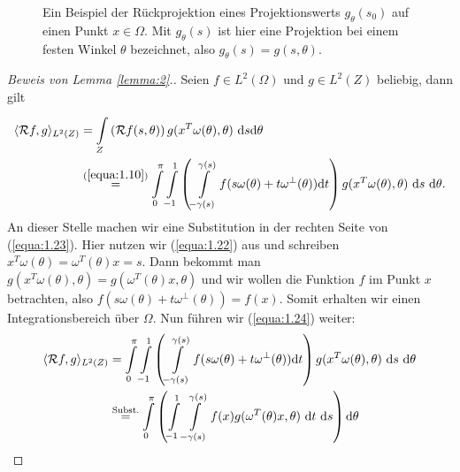 \begin{figure}[!h]
	\caption{Ein Beispiel der Rückprojektion eines Projektionswerts $g_{\theta}(s_0)$ auf einen Punkt $x \in \Omega$. Mit $g_{\theta}(s)$ ist hier eine Projektion bei einem festen Winkel $\theta$ bezeichnet, also $g_{\theta}(s) = g(s,\theta)$.}
	\label{fig:1.7}
\end{figure}	  
\begin{proof}[Beweis von Lemma \ref{lemma:2}.]
Seien $f \in L^2(\Omega)$ und $g \in L^2(Z)$ beliebig, dann gilt
\begin{equation}
	\begin{split}
		\langle \mathcal{R} f, g \rangle_{L^2(Z)} & = \int\limits_{Z}^{} \left( \mathcal{R} f(s,\theta) \right) g(x^{T}\omega(\theta),\theta) \ \mbox{d}s \mbox{d}\theta \\
		& \stackrel{(\ref{equa:1.10})}{=} \int\limits_{0}^{\pi} \int\limits_{-1}^{1} \left( \int\limits_{-\gamma(s)}^{\gamma(s)}f(s\omega(\theta) + t\omega^{\perp}(\theta)) \mbox{d}t  \right) g(x^{T}\omega(\theta),\theta) \ \mbox{d}s \ \mbox{d}\theta.
		\end{split}
	\label{equa:1.23}
\end{equation}
An dieser Stelle machen wir eine Substitution in der rechten Seite von (\ref{equa:1.23}). Hier nutzen wir (\ref{equa:1.22}) aus und schreiben $x^T \omega(\theta) = \omega^T(\theta)x = s$. Dann bekommt man $g(x^{T}\omega(\theta),\theta) = g(\omega^T(\theta)x,\theta)$ und wir wollen die Funktion $f$ im Punkt $x$ betrachten, also $f(s\omega(\theta) + t\omega^{\perp}(\theta)) = f(x)$. Somit erhalten wir einen Integrationsbereich über $\Omega$. Nun führen wir (\ref{equa:1.24}) weiter:
\begin{equation}
	\begin{split}
		\langle \mathcal{R} f, g \rangle_{L^2(Z)} & = \int\limits_{0}^{\pi} \int\limits_{-1}^{1} \left( \int\limits_{-\gamma(s)}^{\gamma(s)}f(s\omega(\theta) + t\omega^{\perp}(\theta)) \mbox{d}t  \right) g(x^{T}\omega(\theta),\theta) \ \mbox{d}s \ \mbox{d}\theta \\
		& \stackrel{\mbox{\scriptsize Subst.}}{=}  \int\limits_{0}^{\pi} \left( \int\limits_{-1}^{1} \int\limits_{-\gamma(s)}^{\gamma(s)}f(x) g(\omega^T(\theta)x,\theta) \ \mbox{d}t \ \mbox{d}s \right) \mbox{d}\theta \\	

\end{split}
\end{equation}
\end{proof}
